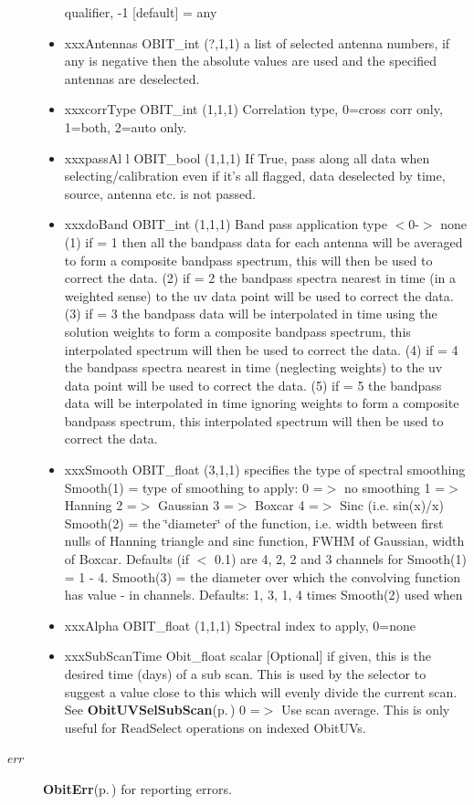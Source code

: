 \begin{Desc}
\begin{description}
\begin{itemize}
qualifier, -1 [default] = any \item xxx\-Antennas OBIT\_\-int (?,1,1) a list of selected antenna numbers, if any is negative then the absolute values are used and the specified antennas are deselected. \item xxxcorr\-Type OBIT\_\-int (1,1,1) Correlation type, 0=cross corr only, 1=both, 2=auto only. \item xxxpass\-Al l OBIT\_\-bool (1,1,1) If True, pass along all data when selecting/calibration even if it's all flagged, data deselected by time, source, antenna etc. is not passed. \item xxxdo\-Band OBIT\_\-int (1,1,1) Band pass application type $<$0-$>$ none (1) if = 1 then all the bandpass data for each antenna will be averaged to form a composite bandpass spectrum, this will then be used to correct the data. (2) if = 2 the bandpass spectra nearest in time (in a weighted sense) to the uv data point will be used to correct the data. (3) if = 3 the bandpass data will be interpolated in time using the solution weights to form a composite bandpass spectrum, this interpolated spectrum will then be used to correct the data. (4) if = 4 the bandpass spectra nearest in time (neglecting weights) to the uv data point will be used to correct the data. (5) if = 5 the bandpass data will be interpolated in time ignoring weights to form a composite bandpass spectrum, this interpolated spectrum will then be used to correct the data. \item xxx\-Smooth OBIT\_\-float (3,1,1) specifies the type of spectral smoothing Smooth(1) = type of smoothing to apply: 0 =$>$ no smoothing 1 =$>$ Hanning 2 =$>$ Gaussian 3 =$>$ Boxcar 4 =$>$ Sinc (i.e. sin(x)/x) Smooth(2) = the \char`\"{}diameter\char`\"{} of the function, i.e. width between first nulls of Hanning triangle and sinc function, FWHM of Gaussian, width of Boxcar. Defaults (if $<$ 0.1) are 4, 2, 2 and 3 channels for Smooth(1) = 1 - 4. Smooth(3) = the diameter over which the convolving function has value - in channels. Defaults: 1, 3, 1, 4 times Smooth(2) used when \item xxx\-Alpha OBIT\_\-float (1,1,1) Spectral index to apply, 0=none \item xxx\-Sub\-Scan\-Time Obit\_\-float scalar [Optional] if given, this is the desired time (days) of a sub scan. This is used by the selector to suggest a value close to this which will evenly divide the current scan. See {\bf Obit\-UVSel\-Sub\-Scan}{\rm (p.\,\pageref{ObitUVSel_8c_a21})} 0 =$>$ Use scan average. This is only useful for Read\-Select operations on indexed Obit\-UVs. \end{itemize}
\item[{\em err}]{\bf Obit\-Err}{\rm (p.\,\pageref{structObitErr})} for reporting errors. \end{description}
\end{Desc}
